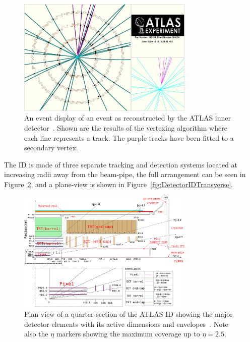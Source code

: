 \begin{figure}[htbp]
  \centering
  \includegraphics[width=0.75\textwidth]{PartDetector/Diagrams/fig_14.eps}
  \caption[An event display of an event as reconstructed by the ATLAS inner detector.]{An event display of an event as reconstructed by the ATLAS inner detector~\cite{Detector:ATLASExperimentGeneral}. Shown are the results of the vertexing algorithm where each line represents a track. The purple tracks have been fitted to a secondary vertex.}\label{fig:DetectorEventDisplayID}
\end{figure}

The ID is made of three separate tracking and detection systems located at increasing radii away from the beam-pipe, the full arrangement can be seen in Figure~\ref{fig:DetectorIDQuarter}, and a plane-view is shown in Figure~\ref{fig:DetectorIDTransverse}.

\begin{figure}
  \centering
    \includegraphics[width=0.75\textwidth]{PartDetector/Diagrams/Detector_ID_QuarterView.eps}
    \caption[Plan-view of a quarter-section of the ATLAS ID showing the major detector elements with its active dimensions and envelopes.]{Plan-view of a quarter-section of the ATLAS ID showing the major detector elements with its active dimensions and envelopes~\cite{Detector:ATLASExperimentGeneral}. Note also the $\eta$ markers showing the maximum coverage up to $\eta=2.5$.}\label{fig:DetectorIDQuarter}
\end{figure}
  
